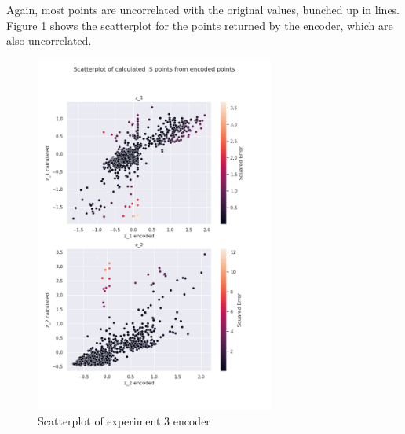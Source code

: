 Again, most points are uncorrelated with the original values, bunched up in lines. Figure \ref{fig:scatter_enc_exp3} shows the scatterplot for the points returned by the encoder, which are also uncorrelated.

\begin{figure}[H]
    \centering
    \includegraphics[width=0.7\textwidth]{Cap5/scatterplot_enc3}
    \caption{Scatterplot of experiment 3 encoder}
    \label{fig:scatter_enc_exp3}
\end{figure}